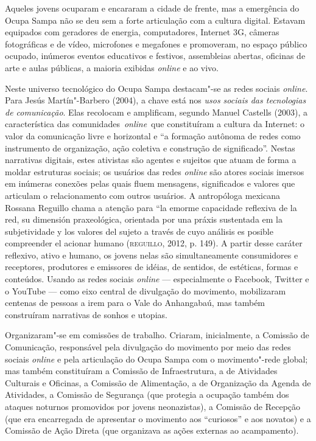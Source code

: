 Aqueles jovens ocuparam e encararam a cidade de frente, mas a
emergência do Ocupa Sampa não se deu sem a forte articulação com a
cultura digital. Estavam equipados com geradores de energia,
computadores, Internet 3G, câmeras fotográficas e de vídeo, microfones e
megafones e promoveram, no espaço público ocupado, inúmeros eventos
educativos e festivos, assembleias abertas, oficinas de arte e aulas
públicas, a maioria exibidas \emph{online} e ao vivo.

Neste universo tecnológico do Ocupa Sampa destacam"-se as redes sociais
\emph{online}. Para Jesús Martín"-Barbero (2004), a chave está nos \emph{usos
sociais das tecnologias de comunicação}. Elas recolocam e amplificam,
segundo Manuel Castells (2003), a característica das
comunidades~\emph{online}~que constituíram a cultura da Internet: o
valor da comunicação livre e horizontal e ``a formação autônoma de redes
como instrumento de organização, ação coletiva e construção de
significado''. Nestas narrativas digitais, estes ativistas são
agentes e sujeitos que atuam de forma a moldar estruturas sociais; os
usuários das redes \emph{online} são atores sociais imersos em
inúmeras conexões pelas quais fluem mensagens, significados e valores
que articulam o relacionamento com outros usuários. A antropóloga
mexicana Rossana Reguillo chama a atenção para ``la emorme capacidade
reflexiva de la red, su dimensión praxeológica, orientada por una práxis
sustentada em la subjetividade y los valores del sujeto a través de cuyo
análisis es posible compreender el acionar humano (\textsc{reguillo}, 2012, p.
149). A partir desse caráter reflexivo, ativo e humano, os jovens
nelas  são simultaneamente consumidores e receptores, produtores e
emissores de idéias, de sentidos, de estéticas, formas e conteúdos.
Usando as redes sociais \emph{online} --- especialmente o Facebook, Twitter e o
YouTube --- como eixo central de divulgação do movimento, mobilizaram
centenas de pessoas a irem para o Vale do Anhangabaú, mas também
construíram narrativas de sonhos e utopias.

Organizaram"-se em comissões de trabalho. Criaram, inicialmente, a
Comissão de Comunicação, responsável pela divulgação do movimento por
meio das redes sociais \emph{online} e pela articulação do Ocupa Sampa
com o movimento"-rede global; mas também constituíram a Comissão de
Infraestrutura, a de Atividades Culturais e Oficinas, a Comissão de
Alimentação, a de Organização da Agenda de Atividades, a Comissão de
Segurança (que protegia a ocupação também dos ataques noturnos
promovidos por jovens neonazistas), a Comissão de Recepção (que era
encarregada de apresentar o movimento aos ``curiosos'' e aos novatos) e
a Comissão de Ação Direta (que organizava as ações externas ao
acampamento).

